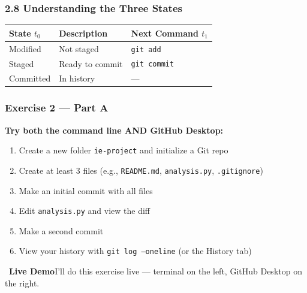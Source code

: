 \documentclass{beamer}
\newcommand{\livedemo}[1]{\begin{alertblock}{\faDesktop\ \textbf{Live Demo}}#1\end{alertblock}}
\begin{document}
\begin{frame}
\frametitle{2.8 Understanding the Three States}

\begin{center}
\end{center}

\vspace{2mm}
\begin{table}[h]
\centering
\scriptsize
\begin{tabular}{lll}
\toprule
\textbf{State $t_0$} & \textbf{Description} & \textbf{Next Command $t_1$} \\
\midrule
Modified & Not staged & \texttt{git add} \\
Staged & Ready to commit & \texttt{git commit} \\
Committed & In history & --- \\
\bottomrule
\end{tabular}
\end{table}
\end{frame}

\begin{frame}
\frametitle{Exercise 2 --- Part A}
\textbf{Try both the command line AND GitHub Desktop:}
\begin{enumerate}
    \item Create a new folder \texttt{ie-project} and initialize a Git repo
    \item Create at least 3 files (e.g., \texttt{README.md}, \texttt{analysis.py}, \texttt{.gitignore})
    \item Make an initial commit with all files
    \item Edit \texttt{analysis.py} and view the diff
    \item Make a second commit
    \item View your history with \texttt{git log --oneline} (or the History tab)
\end{enumerate}
\vspace{2mm}
\livedemo{I'll do this exercise live --- terminal on the left, GitHub Desktop on the right.}
\end{frame}
\end{document}
